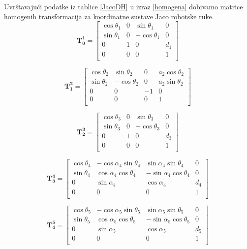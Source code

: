 \documentclass[times, utf8, diplomski, numeric]{fer}
\begin{document}
Uvrštavajući podatke iz tablice \ref{JacoDH} u izraz \ref{homogena} dobivamo matrice homogenih transformacija za koordinatne sustave Jaco robotske ruke.
\begin{equation}
\mathbf{T_0^1} =\begin{bmatrix} \cos\theta_{1}& 0 & \sin\theta_{1} & 0\\ 
\sin\theta_{1}& 0 & -\cos\theta_{1} & 0\\
0 & 1 & 0 & d_{1}\\
0 & 0 & 0 & 1\\
\end{bmatrix}
\end{equation}

\begin{equation}
\mathbf{T_1^2} =\begin{bmatrix} \cos\theta_{2}& \sin\theta_{2} & 0 & a_{2}\cos\theta_{2}\\ 
\sin\theta_{2}& -\cos\theta_{2} & 0 & a_{2}\sin\theta_{2}\\ 
0 & 0 & -1 & 0\\
0 & 0 & 0 & 1\\
\end{bmatrix}
\end{equation}

\begin{equation}
\mathbf{T_2^3} =\begin{bmatrix} \cos\theta_{3}& 0 & \sin\theta_{3} & 0\\ 
\sin\theta_{3}& 0 & -\cos\theta_{3} & 0\\
0 & 1 & 0 & d_{3}\\
0 & 0 & 0 & 1\\
\end{bmatrix}
\end{equation}

\begin{equation}
\mathbf{T_3^4} =\begin{bmatrix} \cos\theta_{4}& -\cos\alpha_{4}\sin\theta_{4} & \sin\alpha_{4}\sin\theta_{4} & 0\\ 
\sin\theta_{4}& \cos\alpha_{4}\cos\theta_{4} & -\sin\alpha_{4}\cos\theta_{4} & 0\\
0 & \sin\alpha_{4} & \cos\alpha_{4} & d_{4}\\
0 & 0 & 0 & 1\\
\end{bmatrix}
\end{equation}

\begin{equation}
\mathbf{T_4^5} =\begin{bmatrix} \cos\theta_{5}& -\cos\alpha_{5}\sin\theta_{5} & \sin\alpha_{5}\sin\theta_{5} & 0\\ 
\sin\theta_{5}& \cos\alpha_{5}\cos\theta_{5} & -\sin\alpha_{5}\cos\theta_{5} & 0\\
0 & \sin\alpha_{5} & \cos\alpha_{5} & d_{5}\\
0 & 0 & 0 & 1\\
\end{bmatrix}
\end{equation}
\end{document}
